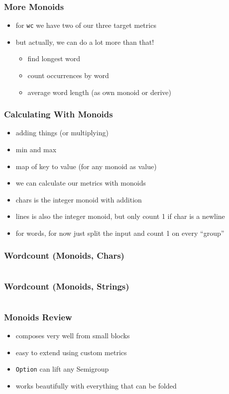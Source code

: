 \documentclass[aspectratio=169]{beamer}
\begin{document}
\begin{frame}
  \frametitle{More Monoids}
  \begin{itemize}
  \item for \texttt{wc} we have two of our three target metrics
  \item but actually, we can do a lot more than that!
    \begin{itemize}
    \item find longest word
    \item count occurrences by word
    \item average word length (as own monoid or derive)
    \end{itemize}
  \end{itemize}
\end{frame}

\begin{frame}
  \frametitle{Calculating With Monoids}
  \begin{itemize}
  \item adding things (or multiplying)
  \item min and max
  \item map of key to value (for any monoid as value)
  \item we can calculate our metrics with monoids
  \item chars is the integer monoid with addition
  \item lines is also the integer monoid, but only count 1 if char is a newline
  \item for words, for now just split the input and count 1 on every ``group''
  \end{itemize}
\end{frame}

\begin{frame}
  \frametitle{Wordcount (Monoids, Chars)}
  \inputminted[fontsize=\footnotesize]{scala}{snippets/wc-monoid-char.scala}
\end{frame}

\begin{frame}
  \frametitle{Wordcount (Monoids, Strings)}
  \inputminted[fontsize=\footnotesize]{scala}{snippets/wc-monoid-string.scala}
\end{frame}

\begin{frame}
  \frametitle{Monoids \textemdash{} Review}
  \begin{itemize}
  \item composes very well from small blocks
  \item easy to extend using custom metrics
  \item \texttt{Option} can lift any Semigroup
  \item works beautifully with everything that can be folded
  \end{itemize}
  \vspace{1cm}
  \inputminted[fontsize=\small]{scala}{snippets/foldable-def.scala}
\end{frame}
\end{document}
